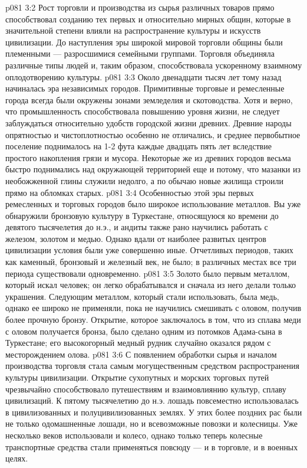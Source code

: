 \vs p081 3:2 Рост торговли и производства из сырья различных товаров прямо способствовал созданию тех первых и относительно мирных общин, которые в значительной степени влияли на распространение культуры и искусств цивилизации. До наступления эры широкой мировой торговли общины были племенными --- разросшимися семейными группами. Торговля объединяла различные типы людей и, таким образом, способствовала ускоренному взаимному оплодотворению культуры.
\vs p081 3:3 Около двенадцати тысяч лет тому назад начиналась эра независимых городов. Примитивные торговые и ремесленные города всегда были окружены зонами земледелия и скотоводства. Хотя и верно, что промышленность способствовала повышению уровня жизни, не следует заблуждаться относительно удобств городской жизни древних. Древние народы опрятностью и чистоплотностью особенно не отличались, и среднее первобытное поселение поднималось на 1\hyp{}2 фута каждые двадцать пять лет вследствие простого накопления грязи и мусора. Некоторые же из древних городов весьма быстро поднимались над окружающей территорией еще и потому, что мазанки из необожженной глины служили недолго, а по обычаю новые жилища строили прямо на обломках старых.
\vs p081 3:4 \pc Особенностью этой эры первых ремесленных и торговых городов было широкое использование металлов. Вы уже обнаружили бронзовую культуру в Туркестане, относящуюся ко времени до девятого тысячелетия до н.э., и андиты также рано научились работать с железом, золотом и медью. Однако вдали от наиболее развитых центров цивилизации условия были уже совершенно иные. Отчетливых периодов, таких как каменный, бронзовый и железный век, не было; в различных местах все три периода существовали одновременно.
\vs p081 3:5 Золото было первым металлом, который искал человек; он легко обрабатывался и сначала из него делали только украшения. Следующим металлом, который стали использовать, была медь, однако ее широко не применяли, пока не научились смешивать с оловом, получив более прочную бронзу. Открытие, которое заключалось в том, что из сплава меди с оловом получается бронза, было сделано одним из потомков Адама\hyp{}сына в Туркестане; его высокогорный медный рудник случайно оказался рядом с месторождением олова.
\vs p081 3:6 \pc С появлением обработки сырья и началом производства торговля стала самым могущественным средством распространения культуры цивилизации. Открытие сухопутных и морских торговых путей чрезвычайно способствовало путешествиям и взаимовлиянию культур, сплаву цивилизаций. К пятому тысячелетию до н.э. лошадь повсеместно использовалась в цивилизованных и полуцивилизованных землях. У этих более поздних рас были не только одомашненные лошади, но и всевозможные повозки и колесницы. Уже несколько веков использовали и колесо, однако только теперь колесные транспортные средства стали применяться повсюду --- и в торговле, и в военных целях.
